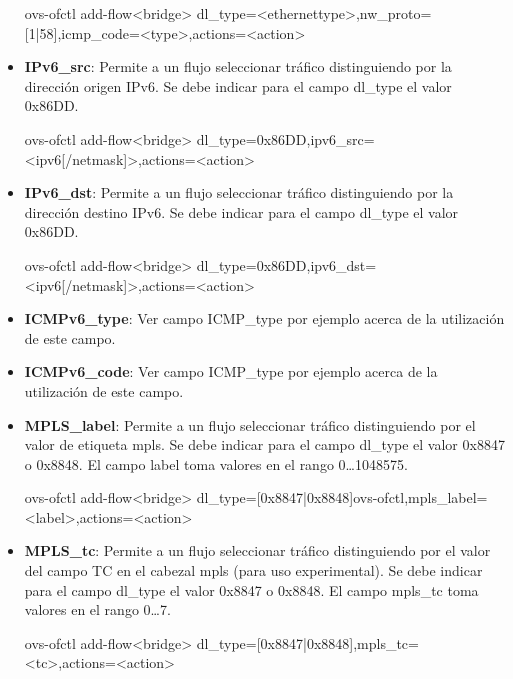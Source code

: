 \begin{itemize}
\begin{center}
ovs-ofctl add-flow<bridge> dl\_type=<ethernettype>,nw\_proto=[1|58],icmp\_code=<type>,actions=<action>
\end{center}

\item \textbf{IPv6\_src}: Permite a un flujo seleccionar tr\'afico distinguiendo por la dirección origen IPv6. Se debe indicar para el campo dl\_type el valor 0x86DD. 

\begin{center}
ovs-ofctl add-flow<bridge> dl\_type=0x86DD,ipv6\_src=<ipv6[/netmask]>,actions=<action>
\end{center}

\item \textbf{IPv6\_dst}: Permite a un flujo seleccionar tr\'afico distinguiendo por la dirección destino IPv6. Se debe indicar para el campo dl\_type el valor 0x86DD. 

\begin{center}
ovs-ofctl add-flow<bridge> dl\_type=0x86DD,ipv6\_dst=<ipv6[/netmask]>,actions=<action>
\end{center}

\item \textbf{ICMPv6\_type}: Ver campo ICMP\_type por ejemplo acerca de la utilización de este campo. 

\item \textbf{ICMPv6\_code}: Ver campo ICMP\_type por ejemplo acerca de la utilización de este campo. 

\item \textbf{MPLS\_label}:  Permite a un flujo seleccionar tr\'afico distinguiendo por el valor de etiqueta mpls. Se debe indicar para el campo dl\_type el valor 0x8847 o 0x8848. El campo label toma valores en el rango 0\dots 1048575.

\begin{center}
ovs-ofctl add-flow<bridge> dl\_type=[0x8847|0x8848]ovs-ofctl,mpls\_label=<label>,actions=<action>
\end{center}

\item \textbf{MPLS\_tc}: Permite a un flujo seleccionar tr\'afico distinguiendo por el valor del campo TC en el cabezal mpls (para uso experimental). Se debe indicar para el campo dl\_type el valor 0x8847 o 0x8848. El campo mpls\_tc toma valores en el rango 0\dots 7.

\begin{center}
ovs-ofctl add-flow<bridge> dl\_type=[0x8847|0x8848],mpls\_tc=<tc>,actions=<action>
\end{center}


\end{itemize}
